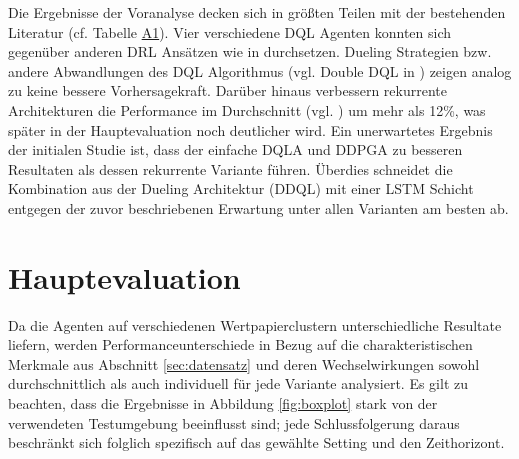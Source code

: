 Die Ergebnisse der Voranalyse decken sich in größten Teilen mit der bestehenden Literatur (cf. Tabelle \hyperref[tabe1]{A1}). Vier verschiedene \acs{DQL} Agenten konnten sich gegenüber anderen \acs{DRL} Ansätzen wie in \parencite{duel,deepQtrader,zhang2019deep} durchsetzen. Dueling Strategien bzw. andere Abwandlungen des \acs{DQL} Algorithmus (vgl. Double \acs{DQL} in \parencite{zhang2019deep}) zeigen analog zu \parencite{zhang2019deep} keine bessere Vorhersagekraft. Darüber hinaus verbessern rekurrente Architekturen die Performance im Durchschnitt (vgl. \parencites{recubetter}) um mehr als 12\%, was später in der Hauptevaluation noch deutlicher wird.
Ein unerwartetes Ergebnis der initialen Studie ist, dass der einfache \acs{DQLA} und \acs{DDPGA} zu besseren Resultaten als dessen rekurrente Variante führen. Überdies schneidet die Kombination aus der Dueling Architektur (\acs{DDQL}) mit einer \acs{LSTM} Schicht entgegen der zuvor beschriebenen Erwartung unter allen Varianten am besten ab.

\section{Hauptevaluation}
\label{sec:erghaupteval}

Da die Agenten auf verschiedenen Wertpapierclustern unterschiedliche Resultate liefern, werden Performanceunterschiede in Bezug auf die charakteristischen Merkmale aus Abschnitt \ref{sec:datensatz} und deren Wechselwirkungen sowohl durchschnittlich als auch individuell für jede Variante analysiert.
Es gilt zu beachten, dass die Ergebnisse in Abbildung \ref{fig:boxplot} stark von der verwendeten Testumgebung beeinflusst sind; jede Schlussfolgerung daraus beschränkt sich folglich spezifisch auf das gewählte Setting und den Zeithorizont.

